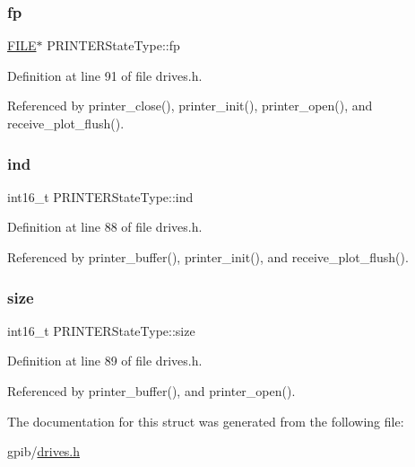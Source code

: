 \subsubsection{\texorpdfstring{fp}{fp}}
{\footnotesize\ttfamily \hyperlink{posix_8h_aed4dabeb9f7c518ded42f930a04abce8}{F\+I\+LE}$\ast$ P\+R\+I\+N\+T\+E\+R\+State\+Type\+::fp}



Definition at line 91 of file drives.\+h.



Referenced by printer\+\_\+close(), printer\+\_\+init(), printer\+\_\+open(), and receive\+\_\+plot\+\_\+flush().

\mbox{\label{structPRINTERStateType_a7d8873d0011f31d7dd00c2b7e0d362bd}} 
\subsubsection{\texorpdfstring{ind}{ind}}
{\footnotesize\ttfamily int16\+\_\+t P\+R\+I\+N\+T\+E\+R\+State\+Type\+::ind}



Definition at line 88 of file drives.\+h.



Referenced by printer\+\_\+buffer(), printer\+\_\+init(), and receive\+\_\+plot\+\_\+flush().

\mbox{\label{structPRINTERStateType_ac6d8323e47879ed58e7fa2cc7cfd7c30}} 
\subsubsection{\texorpdfstring{size}{size}}
{\footnotesize\ttfamily int16\+\_\+t P\+R\+I\+N\+T\+E\+R\+State\+Type\+::size}



Definition at line 89 of file drives.\+h.



Referenced by printer\+\_\+buffer(), and printer\+\_\+open().



The documentation for this struct was generated from the following file\+:\begin{DoxyCompactItemize}
\item 
gpib/\hyperlink{drives_8h}{drives.\+h}\end{DoxyCompactItemize}
